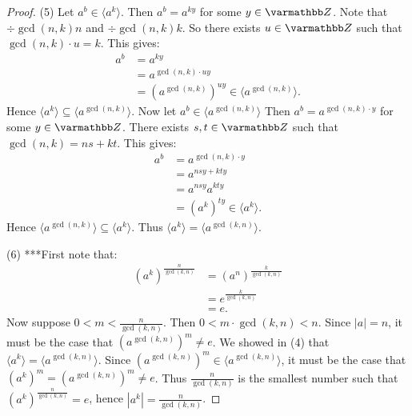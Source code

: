 \begin{proof}
            \noindent (5) Let $a^b \in \langle a^k \rangle$. Then $a^b = a^{ky}$ for some $y \in \bfZ$. Note that $\div{\gcd (n,k)}{n}$ and $\div{\gcd (n,k)}{k}$. So there exists $u \in \bfZ$ such that $\gcd(n,k)\cdot u = k$. This gives:
                \begin{equation*}
                \begin{split}
                    a^b 
                    & = a^{ky} \\
                    & = a^{\gcd(n,k)\cdot u y} \\
                    & = \left(a^{\gcd(n,k)}\right)^{uy} \in \langle a^{\gcd(n,k)} \rangle.
                \end{split}
                \end{equation*}
            Hence $\langle a^k \rangle  \subseteq \langle a^{\gcd(n,k)} \rangle$. Now let $a^b \in \langle a^{\gcd(n,k)} \rangle$ Then $a^b = a^{\gcd(n,k) \cdot y}$ for some $y \in \bfZ$. There exists $s,t \in \bfZ$ such that $\gcd(n,k) = ns + kt$. This gives: 
                \begin{equation*}
                \begin{split}
                    a^b 
                    & = a^{\gcd(n,k)\cdot y} \\
                    & = a^{nsy + kty} \\
                    & = a^{nsy} a^{kty} \\
                    & = \left(a^k\right)^{ty} \in \langle a^k \rangle.
                \end{split}
                \end{equation*}
            Hence $\langle a^{\gcd(n,k)} \rangle \subseteq \langle a^k \rangle$. Thus $\langle a^k \rangle = \langle a^{\gcd(k,n)} \rangle$. \nl
            
            \noindent (6) ***First note that:
                \begin{equation*}
                \begin{split}
                    \left( a^k \right)^{\frac{n}{\gcd(k,n)}} 
                    & = \left(a^n\right)^\frac{k}{\gcd(k,n)} \\
                    & = e^\frac{k}{\gcd(k,n)} \\
                    & = e.
                \end{split}
                \end{equation*}
            Now suppose $0 < m < \frac{n}{\gcd(k,n)}$. Then $0 < m \cdot \gcd(k,n) < n$. Since $|a| = n$, it must be the case that $\left( a^{\gcd(k,n)} \right)^m \neq e$. We showed in (4) that $\langle a^k \rangle = \langle a^{\gcd(k,n)} \rangle$. Since $\left( a^{\gcd(k,n)} \right)^m \in \langle a^{\gcd(k,n)} \rangle$, it must be the case that $\left( a^k \right)^m = \left( a^{\gcd(k,n)} \right)^m \neq e$. Thus $\frac{n}{\gcd(k,n)}$ is the smallest number such that $\left( a^k \right)^{\frac{n}{\gcd(k,n)}} = e$, hence $|a^k| = \frac{n}{\gcd(k,n)}$.
        \end{proof}

